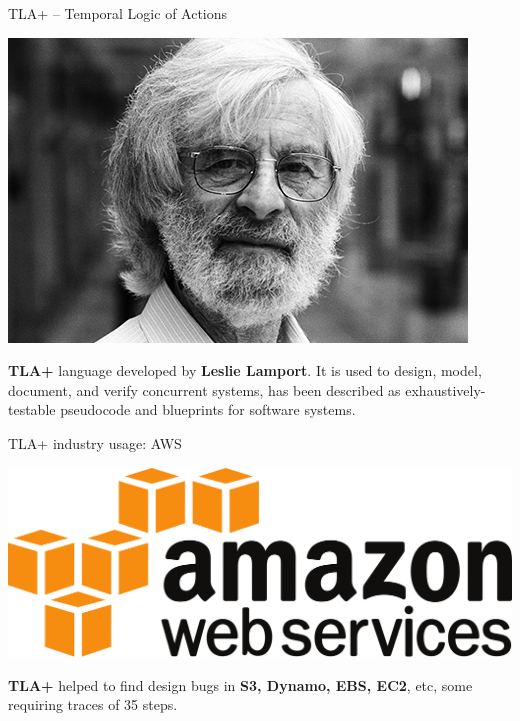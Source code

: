 \documentclass[12pt]{beamer}
\begin{document}
  \begin{frame}{TLA+ -- Temporal Logic of Actions}
      \begin{center}
          \includegraphics[scale=0.3]{figures/lamport.jpg}
      \end{center}
      \textbf{TLA+} language developed by \textbf{Leslie Lamport}. It is
      used to design, model, document, and verify concurrent systems, has
      been described as exhaustively-testable pseudocode and blueprints
      for software systems.
  \end{frame}
  \begin{frame}{TLA+ industry usage: AWS}
    \begin{center}
       \includegraphics[scale=0.08]{figures/aws}
    \end{center}
      \textbf{TLA+} helped to find design bugs in \textbf{S3, Dynamo, EBS, EC2},
      etc, some requiring traces of 35 steps.~\cite{aws2014}
  \end{frame}
\end{document}
